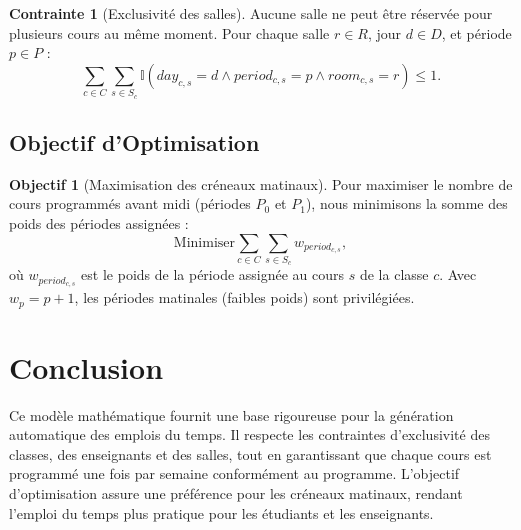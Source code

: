 \documentclass[11pt, a4paper]{article}
\theoremstyle{definition}
\newtheorem{contrainte}{Contrainte}
\newtheorem{objectif}{Objectif}
\begin{document}
\begin{contrainte}[Exclusivité des salles]
Aucune salle ne peut être réservée pour plusieurs cours au même moment. Pour chaque salle \( r \in R \), jour \( d \in D \), et période \( p \in P \) :
\[
\sum_{c \in C} \sum_{s \in S_c} \mathbb{I}(day_{c,s} = d \land period_{c,s} = p \land room_{c,s} = r) \leq 1.
\]
\end{contrainte}

\subsection{Objectif d'Optimisation}

\begin{objectif}[Maximisation des créneaux matinaux]
Pour maximiser le nombre de cours programmés avant midi (périodes \( P_0 \) et \( P_1 \)), nous minimisons la somme des poids des périodes assignées :
\[
\text{Minimiser} \sum_{c \in C} \sum_{s \in S_c} w_{period_{c,s}},
\]
où \( w_{period_{c,s}} \) est le poids de la période assignée au cours \( s \) de la classe \( c \). Avec \( w_p = p + 1 \), les périodes matinales (faibles poids) sont privilégiées.
\end{objectif}

\section{Conclusion}

Ce modèle mathématique fournit une base rigoureuse pour la génération automatique des emplois du temps. Il respecte les contraintes d'exclusivité des classes, des enseignants et des salles, tout en garantissant que chaque cours est programmé une fois par semaine conformément au programme. L'objectif d'optimisation assure une préférence pour les créneaux matinaux, rendant l'emploi du temps plus pratique pour les étudiants et les enseignants.
\end{document}
